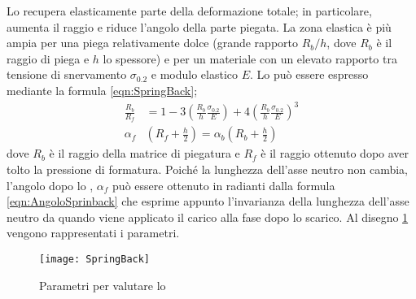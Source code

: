Lo  recupera elasticamente parte della deformazione totale; in particolare, aumenta il raggio e riduce l'angolo della parte piegata.
La zona elastica è più ampia per una piega relativamente dolce (grande rapporto $R_b/h$, dove $R_b$ è il raggio di piega e $h$ lo spessore) e per un materiale con un elevato rapporto tra tensione di snervamento $\sigma_{0.2}$ e modulo elastico $E$. Lo  può essere espresso mediante la formula \eqref{eqn:SpringBack};
\begin{align}
\frac{R_b}{R_f} &= 1 - 3 \left(\frac{R_b}{h}\frac{\sigma_{0.2}}{E}\right) + 4\left(\frac{R_b}{h}\frac{\sigma_{0.2}}{E}\right)^3
\label{eqn:SpringBack}\\
\alpha_f &\left(R_f+\frac{h}{2}\right) = \alpha_b \left(R_b + \frac{h}{2}\right)
\label{eqn:AngoloSprinback}
\end{align}
dove $R_b$ è il raggio della matrice di piegatura e $R_f$ è il raggio ottenuto dopo aver tolto la pressione di formatura.
Poiché la lunghezza dell'asse neutro non cambia, l'angolo dopo lo , $\alpha_f$ può essere ottenuto in radianti dalla formula \eqref{eqn:AngoloSprinback} che esprime appunto l'invarianza della lunghezza dell'asse neutro da quando viene applicato il carico alla fase dopo lo scarico.
Al disegno \ref{fig:SpringBack} vengono rappresentati i parametri.

\begin{figure}
\centering
\texttt{[image: SpringBack]}
\caption{Parametri per valutare lo }
\label{fig:SpringBack}
\end{figure}

